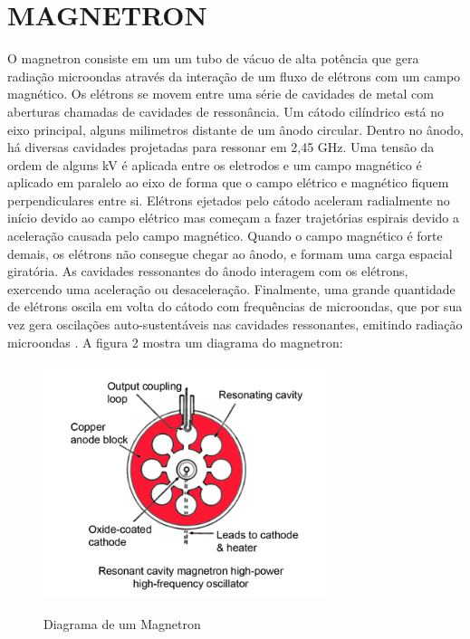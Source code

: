 \section{MAGNETRON}
\label{sec:magnetron}

O magnetron consiste em um um tubo de vácuo de alta potência que gera radiação microondas através da interação de um fluxo de elétrons com um campo magnético. Os elétrons se movem entre uma série de cavidades de metal com aberturas chamadas de cavidades de ressonância. Um cátodo cilíndrico está no eixo principal, alguns milimetros distante de um ânodo circular. Dentro no ânodo, há diversas cavidades projetadas para ressonar em 2,45 GHz. Uma tensão da ordem de alguns kV é aplicada entre os eletrodos e um campo magnético é aplicado em paralelo ao eixo de forma que o campo elétrico e magnético fiquem perpendiculares entre si. Elétrons ejetados pelo cátodo aceleram radialmente no início devido ao campo elétrico mas começam a fazer trajetórias espirais devido a aceleração causada pelo campo magnético. Quando o campo magnético é forte demais, os elétrons não consegue chegar ao ânodo, e formam uma carga espacial giratória. As cavidades ressonantes do ânodo interagem com os elétrons, exercendo uma aceleração ou desaceleração. Finalmente, uma grande quantidade de elétrons oscila em volta do cátodo com frequências de microondas, que por sua vez gera oscilações auto-sustentáveis nas cavidades ressonantes, emitindo radiação microondas \cite{Vollmer}. A figura 2 mostra um diagrama do magnetron:

\begin{figure}[!htb]
    \centering
    \caption{Diagrama de um Magnetron}
    \includegraphics[width=0.75\textwidth]{./dados/figuras/magnetron}
    \label{fig:figura-magnetron}
\end{figure}


